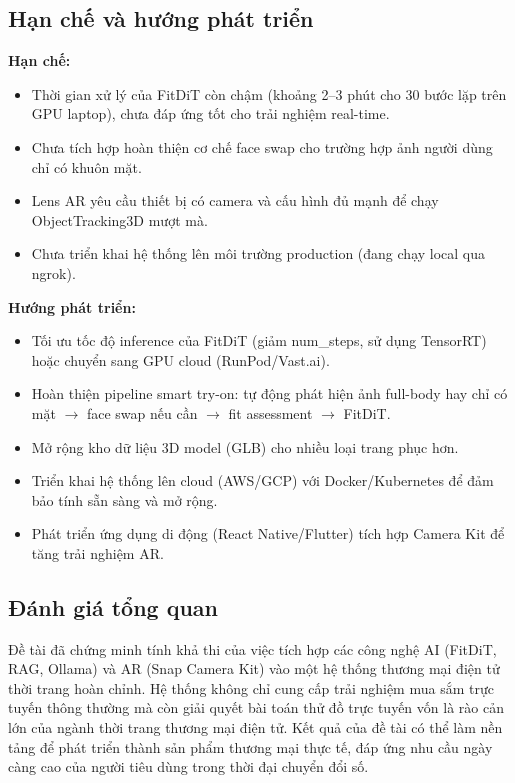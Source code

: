 \subsection{Hạn chế và hướng phát triển}

\textbf{Hạn chế:}
\begin{itemize}[noitemsep]
    \item Thời gian xử lý của FitDiT còn chậm (khoảng 2--3 phút cho 30 bước lặp trên GPU laptop), chưa đáp ứng tốt cho trải nghiệm real-time.
    \item Chưa tích hợp hoàn thiện cơ chế face swap cho trường hợp ảnh người dùng chỉ có khuôn mặt.
    \item Lens AR yêu cầu thiết bị có camera và cấu hình đủ mạnh để chạy ObjectTracking3D mượt mà.
    \item Chưa triển khai hệ thống lên môi trường production (đang chạy local qua ngrok).
\end{itemize}

\textbf{Hướng phát triển:}
\begin{itemize}[noitemsep]
    \item Tối ưu tốc độ inference của FitDiT (giảm num\_steps, sử dụng TensorRT) hoặc chuyển sang GPU cloud (RunPod/Vast.ai).
    \item Hoàn thiện pipeline smart try-on: tự động phát hiện ảnh full-body hay chỉ có mặt $\to$ face swap nếu cần $\to$ fit assessment $\to$ FitDiT.
    \item Mở rộng kho dữ liệu 3D model (GLB) cho nhiều loại trang phục hơn.
    \item Triển khai hệ thống lên cloud (AWS/GCP) với Docker/Kubernetes để đảm bảo tính sẵn sàng và mở rộng.
    \item Phát triển ứng dụng di động (React Native/Flutter) tích hợp Camera Kit để tăng trải nghiệm AR.
\end{itemize}

\subsection{Đánh giá tổng quan}

Đề tài đã chứng minh tính khả thi của việc tích hợp các công nghệ AI (FitDiT, RAG, Ollama) và AR (Snap Camera Kit) vào một hệ thống thương mại điện tử thời trang hoàn chỉnh. Hệ thống không chỉ cung cấp trải nghiệm mua sắm trực tuyến thông thường mà còn giải quyết bài toán thử đồ trực tuyến vốn là rào cản lớn của ngành thời trang thương mại điện tử. Kết quả của đề tài có thể làm nền tảng để phát triển thành sản phẩm thương mại thực tế, đáp ứng nhu cầu ngày càng cao của người tiêu dùng trong thời đại chuyển đổi số.